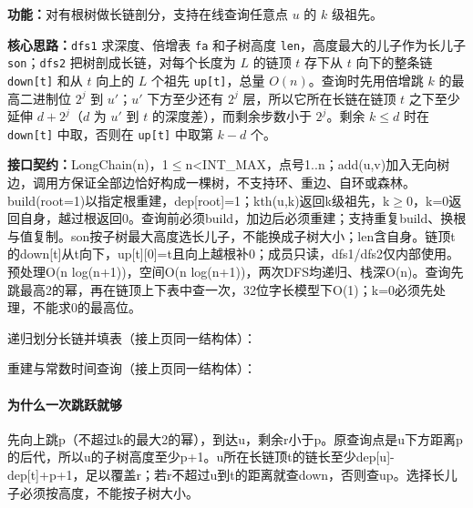 \noindent\textbf{功能：}\allowbreak 对有根树做长链剖分，支持在线查询任意点 $u$ 的 $k$ 级祖先。

\textbf{核心思路：}\allowbreak \texttt{dfs1} 求深度、倍增表 \texttt{fa} 和子树高度 \texttt{len}，高度最大的儿子作为长儿子 \texttt{son}；\texttt{dfs2} 把树剖成长链，对每个长度为 $L$ 的链顶 $t$ 存下从 $t$ 向下的整条链 \texttt{down[t]} 和从 $t$ 向上的 $L$ 个祖先 \texttt{up[t]}，总量 $O(n)$。查询时先用倍增跳 $k$ 的最高二进制位 $2^j$ 到 $u'$；$u'$ 下方至少还有 $2^j$ 层，所以它所在长链在链顶 $t$ 之下至少延伸 $d+2^j$（$d$ 为 $u'$ 到 $t$ 的深度差），而剩余步数小于 $2^j$。剩余 $k\le d$ 时在 \texttt{down[t]} 中取，否则在 \texttt{up[t]} 中取第 $k-d$ 个。



{\sloppy{}\noindent\textbf{接口契约：}LongChain(n)，1$\le$n<INT\_MAX，点号1..n；add(u,v)加入无向树边，调用方保证全部边恰好构成一棵树，不支持环、重边、自环或森林。build(root=1)以指定根重建，dep[root]=1；kth(u,k)返回k级祖先，k$\ge$0，k=0返回自身，越过根返回0。查询前必须build，加边后必须重建；支持重复build、换根与值复制。son按子树最大高度选长儿子，不能换成子树大小；len含自身。链顶t的down[t]从t向下，up[t][0]=t且向上越根补0；成员只读，dfs1/dfs2仅内部使用。预处理O(n log(n+1))，空间O(n log(n+1))，两次DFS均递归、栈深O(n)。查询先跳最高2的幂，再在链顶上下表中查一次，32位字长模型下O(1)；k=0必须先处理，不能求0的最高位。\par}

\Needspace{492pt}



\newpage

\noindent 递归划分长链并填表（接上页同一结构体）：



\newpage

\noindent 重建与常数时间查询（接上页同一结构体）：



\paragraph{为什么一次跳跃就够} 先向上跳p（不超过k的最大2的幂），到达u，剩余r小于p。原查询点是u下方距离p的后代，所以u的子树高度至少p+1。u所在长链顶t的链长至少dep[u]-dep[t]+p+1，足以覆盖r；若r不超过u到t的距离就查down，否则查up。选择长儿子必须按高度，不能按子树大小。

